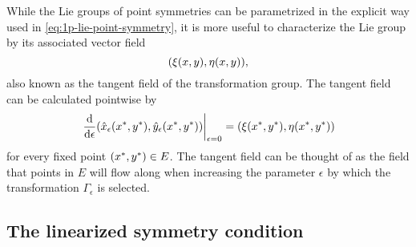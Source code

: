 While the Lie groups of point symmetries can be parametrized in the explicit way used in \cref{eq:1p-lie-point-symmetry}, it is more useful to characterize the Lie group by its associated vector field
\begin{equation} \label{eq:tangent-field}
  \pqty{\xi(x,y), \eta(x,y)},
\end{equation}
also known as the tangent field of the transformation group.
The tangent field can be calculated pointwise by 
\begin{equation}
  \eval{\dv{\epsilon} \pqty{\hat{x}_\epsilon(\fixed{x},\fixed{y}), \hat{y}_\epsilon(\fixed{x},\fixed{y})}}_{\epsilon=0} = \pqty{\xi(\fixed{x},\fixed{y}), \eta(\fixed{x},\fixed{y})}
\end{equation}
for every fixed point \(\pqty{\fixed{x},\fixed{y}} \in E\).
The tangent field can be thought of as the field that points in \(E\) will flow along when increasing the parameter \(\epsilon\) by which the transformation \(\Gamma_\epsilon\) is selected.

\subsection{The linearized symmetry condition}

